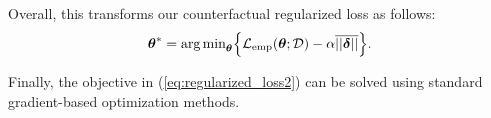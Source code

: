 Overall, this transforms our counterfactual regularized loss as follows:
\begin{equation}\label{eq:regularized_loss2}
\boldsymbol{\theta}^* = \text{arg\,min}_{\boldsymbol{\theta}}\Big\{\mathcal{L}_{\text{emp}}(\boldsymbol{\theta};\mathcal{D}) - \alpha \overline{||{\boldsymbol{\delta}}||} \Big\}.
\end{equation}

Finally, the objective in (\ref{eq:regularized_loss2}) can be solved using standard gradient-based optimization methods.

